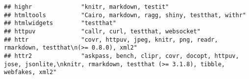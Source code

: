 \documentclass[
]{article}
\begin{document}
\begin{verbatim}
## highr              "knitr, markdown, testit"                                                                                                                                                                                                                                                                                                                                                                                                                                                         
## htmltools          "Cairo, markdown, ragg, shiny, testthat, withr"                                                                                                                                                                                                                                                                                                                                                                                                                                   
## htmlwidgets        "testthat"                                                                                                                                                                                                                                                                                                                                                                                                                                                                        
## httpuv             "callr, curl, testthat, websocket"                                                                                                                                                                                                                                                                                                                                                                                                                                                
## httr               "covr, httpuv, jpeg, knitr, png, readr, rmarkdown, testthat\n(>= 0.8.0), xml2"                                                                                                                                                                                                                                                                                                                                                                                                    
## httr2              "askpass, bench, clipr, covr, docopt, httpuv, jose, jsonlite,\nknitr, rmarkdown, testthat (>= 3.1.8), tibble, webfakes, xml2"                                                                                                                                                                                                                                                                                                                                                     

\end{verbatim}
\end{document}
